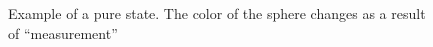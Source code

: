 \begin{figure}
\centering



\caption{Example of a pure state. The color of the sphere changes as a result of ``measurement''}
\label{figAddPureStateExample}
\end{figure}

